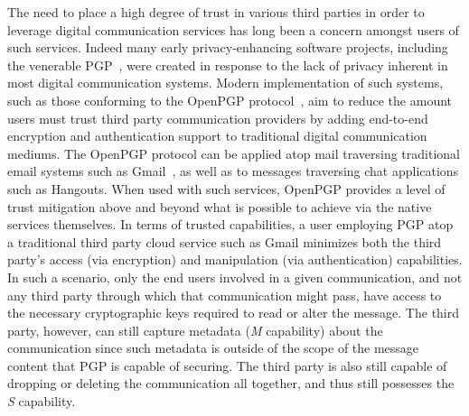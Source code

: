 The need to place a high degree of trust in various third parties in
order to leverage digital communication services has long been a
concern amongst users of such services. Indeed many early
privacy-enhancing software projects, including the venerable
PGP~\cite{zimmermann-pgpsource, zimmermann-pgp10}, were created in
response to the lack of privacy inherent in most digital communication
systems. Modern implementation of such systems, such as those
conforming to the OpenPGP protocol~\cite{callas2007}, aim to reduce
the amount users must trust third party communication providers by
adding end-to-end encryption and authentication support to traditional
digital communication mediums. The OpenPGP protocol can be applied
atop mail traversing traditional email systems such as
Gmail~\cite{google-endtoend}, as well as to messages traversing chat
applications such as Hangouts. When used with such services,
OpenPGP provides a level of trust mitigation above and beyond what is
possible to achieve via the native services themselves. In terms of
trusted capabilities, a user employing PGP atop a traditional third
party cloud service such as Gmail minimizes both the third party's
access (via encryption) and manipulation (via authentication)
capabilities. In such a scenario, only the end users involved in a
given communication, and not any third party through which that
communication might pass, have access to the necessary cryptographic
keys required to read or alter the message. The third party, however,
can still capture metadata (\emph{M} capability) about the
communication since such metadata is outside of the scope of the
message content that PGP is capable of securing. The third party is
also still capable of dropping or deleting the communication all
together, and thus still possesses the \emph{S} capability.

